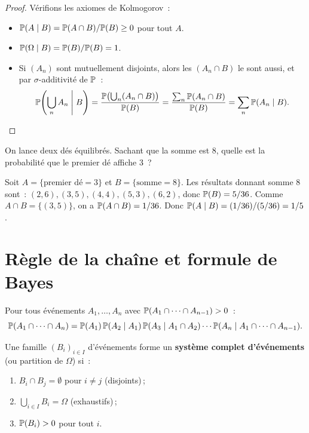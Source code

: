 \begin{proof}
V\'erifions les axiomes de Kolmogorov~:
\begin{itemize}
    \item $\mathbb{P}(A \mid B) = \mathbb{P}(A \cap B)/\mathbb{P}(B) \geq 0$ pour tout $A$.
    \item $\mathbb{P}(\Omega \mid B) = \mathbb{P}(B)/\mathbb{P}(B) = 1$.
    \item Si $(A_n)$ sont mutuellement disjoints, alors les $(A_n \cap B)$ le sont
    aussi, et par $\sigma$-additivit\'e de $\mathbb{P}$~:
    \[
        \mathbb{P}\!\left(\bigcup_n A_n \;\middle|\; B\right)
        = \frac{\mathbb{P}\bigl(\bigcup_n (A_n \cap B)\bigr)}{\mathbb{P}(B)}
        = \frac{\sum_n \mathbb{P}(A_n \cap B)}{\mathbb{P}(B)}
        = \sum_n \mathbb{P}(A_n \mid B). \qedhere
    \]
\end{itemize}
\end{proof}

\begin{exemple}
On lance deux d\'es \'equilibr\'es. Sachant que la somme est 8, quelle est la
probabilit\'e que le premier d\'e affiche 3~?

Soit $A = \{\text{premier d\'e} = 3\}$ et $B = \{\text{somme} = 8\}$.
Les r\'esultats donnant somme 8 sont~: $(2,6), (3,5), (4,4), (5,3), (6,2)$,
donc $\mathbb{P}(B) = 5/36$. Comme $A \cap B = \{(3,5)\}$, on a $\mathbb{P}(A \cap B) = 1/36$.
Donc $\mathbb{P}(A \mid B) = (1/36)/(5/36) = 1/5$.
\end{exemple}

\section{R\`egle de la cha\^ine et formule de Bayes}

\begin{theoreme}
Pour tous \'ev\'enements $A_1, \ldots, A_n$ avec
$\mathbb{P}(A_1 \cap \cdots \cap A_{n-1}) > 0$~:
\[
    \mathbb{P}(A_1 \cap \cdots \cap A_n)
    = \mathbb{P}(A_1)\, \mathbb{P}(A_2 \mid A_1)\, \mathbb{P}(A_3 \mid A_1 \cap A_2)
    \cdots \mathbb{P}(A_n \mid A_1 \cap \cdots \cap A_{n-1}).
\]
\end{theoreme}

\begin{definition}
Une famille $(B_i)_{i \in I}$ d'\'ev\'enements forme un \textbf{syst\`eme complet
d'\'ev\'enements} (ou partition de $\Omega$) si~:
\begin{enumerate}[label=(\roman*)]
    \item $B_i \cap B_j = \emptyset$ pour $i \neq j$ (disjoints)\,;
    \item $\bigcup_{i \in I} B_i = \Omega$ (exhaustifs)\,;
    \item $\mathbb{P}(B_i) > 0$ pour tout $i$.
\end{enumerate}
\end{definition}

